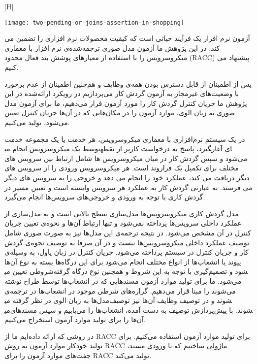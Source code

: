 [H]
\raggedright
\texttt{[image: two-pending-or-joins-assertion-in-shopping]}
\vspace{0.5em}





آزمون نرم افزار یک فرآیند حیاتی است که کیفیت محصولات نرم افزاری را تضمین می کند. در این پژوهش ما آزمون مدل صوری ترجمه‌شده‌ی نرم افزار با معماری میکروسرویس را با استفاده از معیارهای پوشش بند فعال محدود (RACC) پیشنهاد می کنیم.

پس از اطمینان از قابل دسترس بودن همه‌ی وظایف و هم‌چنین اطمینان از عدم برخورد با وضعیت‌های غیرمجاز به آزمون گردش‌ کار می‌پردازیم در رویکرد ارائه‌شده در این پژوهش ما جریان کنترل گردش کار را مورد آزمون قرار می‌دهیم، ما برای آزمون مدل صوری به زبان الوی، موارد آزمون را در مکان‌هایی که در آن‌ها جریان کنترل تعیین می‌شود، تولید می‌کنیم. 

در یک سیستم نرم‌افزاری با معماری میکروسرویس، هر خدمت یا یک مجموعه خدمت توسط یک میکروسرویس انجام می‎گیرد، پاسخ به درخواست کاربر از نقطه‎ای آغاز می‌شود و سپس گردش کار در میان میکروسرویس ها شامل ارتباط بین سرویس های مختلف برای تکمیل یک فراروند است. هر میکروسرویس ورودی را از سرویس های دیگر دریافت می کند، عملکرد خود را انجام می دهد و خروجی را به سرویس های دیگر می فرستد. به عبارتی گردش کار به عملکرد هر سرویس وابسته است و تعیین مسیر در گردش کاری با توجه به ورودی و خروجی‌های سرویس‌ها انجام می‌گیرد. 

مدل‌ گردش کاری میکروسرویس‌ها مدل‌سازی سطح بالایی است و به مدل‌سازی از عملکرد داخلی سرویس‌ها پرداخته نمی‌شود و تنها ارتباط آن‌ها و نحوه‌ی تعیین جریان کنترل در آن مشخص می‌شود. در نتیجه ترجمه‌ی این مدل‌ها نیز به صورت صوری شامل توصیف عملکرد داخلی میکروسرویس‌ها نیست و در آن صرفا به توصیف نحوه‌ی گردش کار و جریان کنترل در سیستم پرداخته می‌شود. جریان کنترل در زبان‌ یاول، به وسیله‌ی پیوند یا انشعاب‌ها از انواع مختلف انجام می‌شود برای این درگاه‌ها بسته به نوع آن‌ها شروطی تعیین می‎شود و تصمیم‌گیری با توجه به این شروط و همچنین نوع درگاه گرفته می‌شود. 
ما برای تولید موارد آزمون مسندهایی که در انشعاب‌ها توسط طراح نوشته می‌شوند را مبنا قرار می‌دهیم. گزاره‌های شرطی موجود در انشعاب‌ها در ترجمه‌ی مدل‌ها به زبان الوی در نظر گرفته می‎شوند و در توصیف وظایف آن‌ها نیز توصیف می‎شوند. با پیش‌پردازش توصیف به دست ‌آمده، انشعاب‌ها را می‌یابیم و سپس مسندهای آن‌ها را برای تولید موارد آزمون استخراج می‌کنیم. 

در روشی که ارائه داده‌ایم ما از RACC برای تولید موارد آزمون استفاده می‌کنیم. برای تولید خودکار موارد آزمون به روش RACC ماژولی ساختیم که با ورودی مسند، جفت‌های موارد آزمون را برای RACC تولید می‌کند. 

